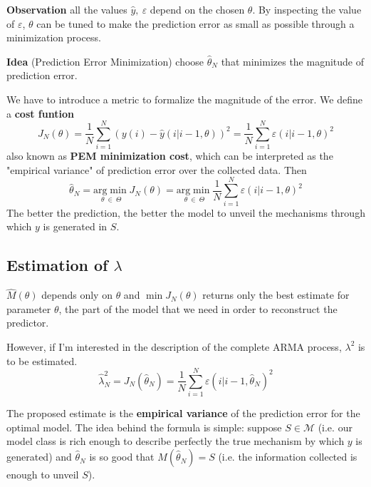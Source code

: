 \textbf{Observation}
all the values $ \hat{y} ,\ \varepsilon $ depend on the chosen $ \theta $. By inspecting the value of $ \varepsilon $, $ \theta $ can be tuned to make the prediction error as small as possible through a minimization process.

\textbf{Idea} (Prediction Error Minimization)
choose $ \hat{\theta }_{N}$ that minimizes the magnitude of prediction error.

We have to introduce a metric to formalize the magnitude of the error. We define a \textbf{cost funtion} 
\begin{equation*}
J_{N}( \theta ) =\frac{1}{N}\sum _{i=1}^{N}( y( i) -\hat{y}( i|i-1,\theta ))^{2} =\frac{1}{N}\sum _{i=1}^{N} \varepsilon ( i|i-1,\theta )^{2}
\end{equation*}
also known as \textbf{PEM minimization cost}, which can be interpreted as the "empirical variance" of prediction error over the collected data. Then 
\begin{equation*}
\hat{\theta }_{N} =\underset{\theta \ \in \ \Theta }{\mathrm{arg}\min} J_{N}( \theta ) =\underset{\theta \ \in \ \Theta }{\mathrm{arg}\min}\frac{1}{N}\sum _{i=1}^{N} \varepsilon ( i|i-1,\theta )^{2}
\end{equation*}
The better the prediction, the better the model to unveil the mechanisms through which $ y$ is generated in $ S$. 

\subsection{Estimation of $\lambda$}

$ \hat{M}( \theta )$ depends only on $ \theta $ and $ \min J_{N}( \theta )$ returns only the best estimate for  parameter $ \theta $, the part of the model that we need in order to reconstruct the predictor.

However, if I'm interested in the description of the complete ARMA process, $ \lambda ^{2}$ is to be estimated. 
\begin{equation*}
\hat{\lambda }_{N}^{2} =J_{N}(\hat{\theta }_{N}) =\frac{1}{N}\sum _{i=1}^{N} \varepsilon ( i|i-1,\hat{\theta }_{N})^{2}
\end{equation*}

The proposed estimate is the \textbf{empirical variance} of the prediction error for the optimal model. The idea behind the formula is simple: suppose $ S\in \mathcal{M} $ (i.e. our model class is rich enough to describe perfectly the true mechanism by which $ y$ is generated) and $\hat{\theta }_{N}$ is so good that $M(\hat{\theta }_{N}) =S$ (i.e. the information collected is enough to unveil $ S$).

